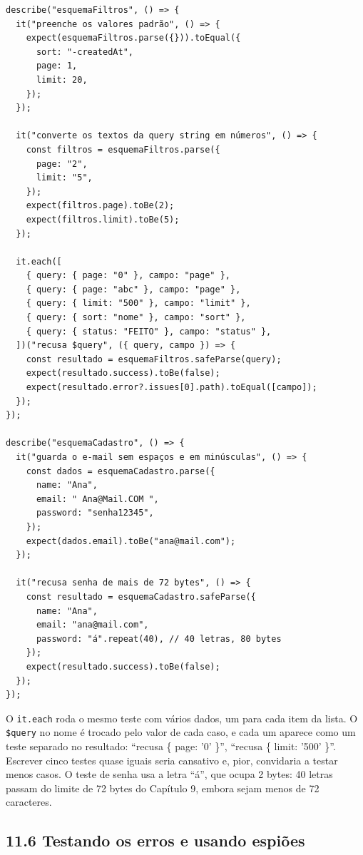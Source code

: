 \begin{codigo}
\begin{Verbatim}[breaklines=true, breaksymbolleft={}, fontsize=\footnotesize]
describe("esquemaFiltros", () => {
  it("preenche os valores padrão", () => {
    expect(esquemaFiltros.parse({})).toEqual({
      sort: "-createdAt",
      page: 1,
      limit: 20,
    });
  });

  it("converte os textos da query string em números", () => {
    const filtros = esquemaFiltros.parse({
      page: "2",
      limit: "5",
    });
    expect(filtros.page).toBe(2);
    expect(filtros.limit).toBe(5);
  });

  it.each([
    { query: { page: "0" }, campo: "page" },
    { query: { page: "abc" }, campo: "page" },
    { query: { limit: "500" }, campo: "limit" },
    { query: { sort: "nome" }, campo: "sort" },
    { query: { status: "FEITO" }, campo: "status" },
  ])("recusa $query", ({ query, campo }) => {
    const resultado = esquemaFiltros.safeParse(query);
    expect(resultado.success).toBe(false);
    expect(resultado.error?.issues[0].path).toEqual([campo]);
  });
});

describe("esquemaCadastro", () => {
  it("guarda o e-mail sem espaços e em minúsculas", () => {
    const dados = esquemaCadastro.parse({
      name: "Ana",
      email: " Ana@Mail.COM ",
      password: "senha12345",
    });
    expect(dados.email).toBe("ana@mail.com");
  });

  it("recusa senha de mais de 72 bytes", () => {
    const resultado = esquemaCadastro.safeParse({
      name: "Ana",
      email: "ana@mail.com",
      password: "á".repeat(40), // 40 letras, 80 bytes
    });
    expect(resultado.success).toBe(false);
  });
});
\end{Verbatim}
\end{codigo}

O \texttt{it.each} roda o mesmo teste com vários dados, um para cada item da lista. O \texttt{\$query} no nome é trocado pelo valor de cada caso, e cada um aparece como um teste separado no resultado: ``recusa \{ page: '0' \}'', ``recusa \{ limit: '500' \}''. Escrever cinco testes quase iguais seria cansativo e, pior, convidaria a testar menos casos. O teste de senha usa a letra ``á'', que ocupa 2 bytes: 40 letras passam do limite de 72 bytes do Capítulo 9, embora sejam menos de 72 caracteres.

\subsection{11.6 Testando os erros e usando espiões}

